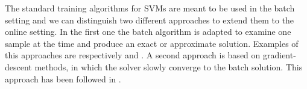 The standard training algorithms for SVMs are meant to be used in the
batch setting and we can distinguish two different approaches to extend
them to the online setting. In the first one the batch algorithm is
adapted to examine one sample at the time and produce an exact or
approximate solution. Examples of this approaches are respectively \cite{CauwenberghsP00}
and \cite{SyedLS99}. A second approach is based on
gradient-descent methods, in which the solver slowly converge to the batch
solution. This approach has been followed in
\cite{KivinenSW04,ChengVSWC07}.
